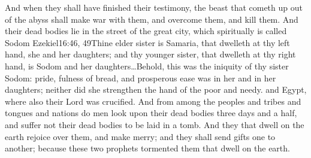 And when they shall have finished their testimony, the beast that cometh up out of the abyss%
 shall make war with them, and overcome them, and kill them.%
And their dead bodies lie in the street%
of the great city,%
which spiritually is called Sodom%
				   {Ezekiel}{16:46, 49}{Thine elder sister is Samaria, that dwelleth at thy left hand, she and her daughters; and thy younger sister, that dwelleth at thy right hand, is Sodom and her daughters\ldots Behold, this was the iniquity of thy sister Sodom: pride, fulness of bread, and prosperous ease was in her and in her daughters; neither did she strengthen the hand of the poor and needy.} %
and Egypt,%
where also their Lord was crucified. 
And from among the peoples and tribes and tongues and nations do men look upon their dead bodies three days and a half, and suffer not their dead bodies to be laid in a tomb. 
And they that dwell on the earth rejoice over them, and make merry; and they shall send gifts one to another; because these two prophets tormented them that dwell on the earth.%
	
